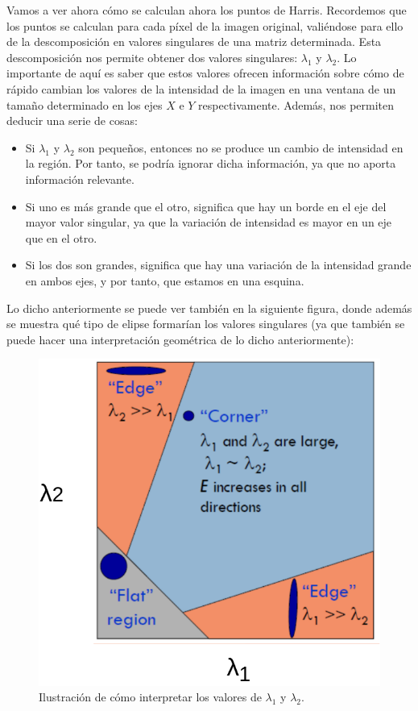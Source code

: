 \documentclass[11pt,a4paper]{article}
\begin{document}
Vamos a ver ahora cómo se calculan ahora los puntos de Harris. Recordemos que
los puntos se calculan para cada píxel de la imagen original, valiéndose para ello de la
descomposición en valores singulares de una matriz determinada.
Esta descomposición nos permite obtener dos valores singulares: $\lambda_1$ y $\lambda_2$.
Lo importante de aquí es saber que estos valores
ofrecen información sobre cómo de rápido cambian los valores de la intensidad de la
imagen en una ventana de un tamaño determinado en los ejes $X$ e $Y$ respectivamente.
Además, nos permiten deducir una serie de cosas:

\begin{itemize}[label=\textbullet]
	\item Si $\lambda_1$ y $\lambda_2$ son pequeños, entonces no se produce
	un cambio de intensidad en la región. Por tanto, se podría ignorar dicha información,
	ya que no aporta información relevante.
	\item Si uno es más grande que el otro, significa que hay un borde en el eje del
	mayor valor singular, ya que la variación de intensidad es mayor en un eje que en
	el otro.
	\item Si los dos son grandes, significa que hay una variación de la intensidad grande
	en ambos ejes, y por tanto, que estamos en una esquina.
\end{itemize}

Lo dicho anteriormente se puede ver también en la siguiente figura, donde además
se muestra qué tipo de elipse formarían los valores singulares (ya que también se puede
hacer una interpretación geométrica de lo dicho anteriormente):

\begin{figure}[H]
	\centering
	\includegraphics[scale=0.4]{img/eig2.png}
	\caption{Ilustración de cómo interpretar los valores de $\lambda_1$ y $\lambda_2$.}
	\label{fig:eig}
\end{figure}
\end{document}
